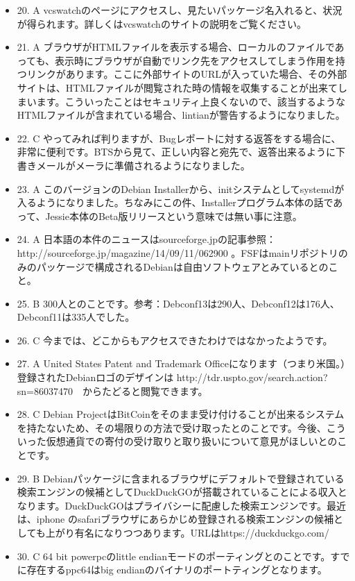 \documentclass[mingoth,a4paper]{jsarticle}
\begin{document}
\begin{itemize}
\item
20. A vcswatchのページにアクセスし、見たいパッケージ名入れると、状況が得られます。詳しくはvcswatchのサイトの説明をご覧ください。
\item
21. A ブラウザがHTMLファイルを表示する場合、ローカルのファイルであっても、表示時にブラウザが自動でリンク先をアクセスしてしまう作用を持つリンクがあります。ここに外部サイトのURLが入っていた場合、その外部サイトは、HTMLファイルが閲覧された時の情報を収集することが出来てしまいます。こういったことはセキュリティ上良くないので、該当するようなHTMLファイルが含まれている場合、lintianが警告するようになりました。
\item
22. C やってみれば判りますが、Bugレポートに対する返答をする場合に、非常に便利です。BTSから見て、正しい内容と宛先で、返答出来るように下書きメールがメーラに準備されるようになりました。
\item
23. A このバージョンのDebian Installerから、initシステムとしてsystemdが入るようになりました。ちなみにこの件、Installerプログラム本体の話であって、Jessie本体のBeta版リリースという意味では無い事に注意。
\item
24. A 日本語の本件のニュースはsourceforge.jpの記事参照：http://sourceforge.jp/magazine/14/09/11/062900 。FSFはmainリポジトリのみのパッケージで構成されるDebianは自由ソフトウェアとみているとのこと。
\item
25. B 300人とのことです。参考：Debconf13は290人、Debconf12は176人、Debconf11は335人でした。
\item
26. C 今までは、どこからもアクセスできたわけではなかったようです。
\item
27. A United States Patent and Trademark Officeになります（つまり米国。）登録されたDebianロゴのデザインは http://tdr.uspto.gov/search.action?sn=86037470　からたどると閲覧できます。
\item
28. C Debian ProjectはBitCoinをそのまま受け付けることが出来るシステムを持たないため、その場限りの方法で受け取ったとのことです。今後、こういった仮想通貨での寄付の受け取りと取り扱いについて意見がほしいとのことです。
\item
29. B Debianパッケージに含まれるブラウザにデフォルトで登録されている検索エンジンの候補としてDuckDuckGOが搭載されていることによる収入となります。DuckDuckGOはプライバシーに配慮した検索エンジンです。最近は、iphone のsafariブラウザにあらかじめ登録される検索エンジンの候補としても上がり有名になりつつあります。URLはhttps://duckduckgo.com/
\item
30. C 64 bit powerpcのlittle endianモードのポーティングとのことです。すでに存在するppc64はbig endianのバイナリのポートティングとなります。

\end{itemize}
\end{document}
